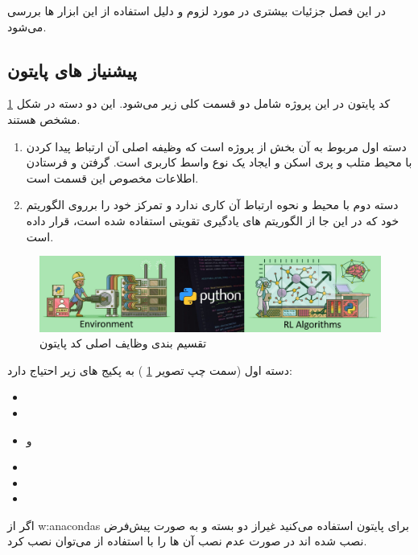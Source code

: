 در این فصل جزئیات بیشتری در مورد لزوم و دلیل استفاده از این ابزار ها بررسی می‌شود.




\subsection{پیشنیاز های پایتون}

\begin{note}
	
	کد پایتون در این پروژه شامل دو قسمت کلی زیر می‌شود. این دو دسته در شکل
	\ref{fig:python-layers-env-alg}
	مشخص هستند.
	\begin{enumerate}
		\item 
		دسته اول مربوط به آن بخش از پروژه است که وظیفه اصلی آن ارتباط پیدا کردن با محیط متلب و پری اسکن و ایجاد یک نوع واسط کاربری است. گرفتن و فرستادن اطلاعات مخصوص این قسمت است.
		\item 
		دسته دوم با محیط و نحوه ارتباط آن کاری ندارد و تمرکز خود را بر‌روی الگوریتم خود که در این جا از الگوریتم های یادگیری تقویتی استفاده شده است، قرار داده است.
	\end{enumerate}
	
\end{note}

\begin{figure}
	\centering
	\includegraphics[width=\linewidth]{Figures/python-layers-env-alg}
	\caption{تقسیم بندی وظایف اصلی کد پایتون}
	\label{fig:python-layers-env-alg}
\end{figure}


دسته اول (سمت چپ تصویر
\ref{fig:python-layers-env-alg}
)
به پکیج های زیر احتیاج دارد:
\begin{multicols}{3}
	\begin{itemize}
		\item {} \item {} \item{} و  \item {}
		\item {} \item {}
	\end{itemize}
\end{multicols}
اگر از 
\glspl{w:anaconda}
برای پایتون استفاده می‌کنید غیراز دو بسته 
و 
به صورت پیش‌فرض نصب شده اند در صورت عدم نصب آن ها را با استفاده از 
می‌توان نصب کرد.


